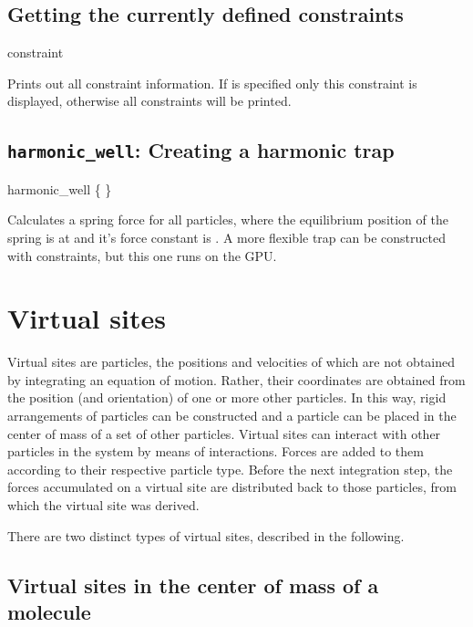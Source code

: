\subsection{Getting the currently defined constraints}
\begin{essyntax}
constraint   
\end{essyntax}
Prints out all constraint information. If  is specified only this
constraint is displayed, otherwise all constraints will be printed.

\subsection{\texttt{harmonic_well}: Creating a harmonic trap}
 \begin{essyntax}
   harmonic_well \{    \} 
  \begin{features}
  \end{features}
 \end{essyntax}

 Calculates a spring force for all particles, where the equilibrium position
 of the spring is at  and it's force constant is . A more
 flexible trap can be constructed with constraints, but this one runs on the GPU.

\section{Virtual sites}
\label{sec:virtual}

Virtual sites are particles, the positions and velocities of which are
not obtained by integrating an equation of motion.  Rather, their
coordinates are obtained from the position (and orientation) of one or
more other particles. In this way, rigid arrangements of particles can
be constructed and a particle can be placed in the center of mass of a
set of other particles.  Virtual sites can interact with other
particles in the system by means of interactions. Forces are added to
them according to their respective particle type. Before the next
integration step, the forces accumulated on a virtual site are
distributed back to those particles, from which the virtual site was
derived.

There are two distinct types of virtual sites, described in the
following.

\subsection{Virtual sites in the center of mass of a molecule}

